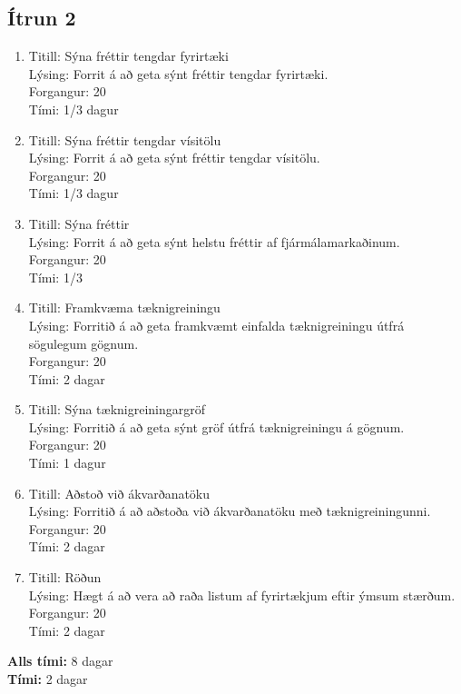 \documentclass[a4,12pt]{article}
\begin{document}
\subsection{Ítrun 2}
\begin{enumerate}[]
\item Titill: Sýna fréttir tengdar fyrirtæki\\
Lýsing: Forrit á að geta sýnt fréttir tengdar fyrirtæki.\\
Forgangur: 20\\
Tími: 1/3 dagur

\item Titill: Sýna fréttir tengdar vísitölu\\
Lýsing: Forrit á að geta sýnt fréttir tengdar vísitölu.\\ 
Forgangur: 20\\
Tími: 1/3 dagur

\item Titill: Sýna fréttir\\
Lýsing: Forrit á að geta sýnt helstu fréttir af fjármálamarkaðinum.\\
Forgangur: 20\\
Tími: 1/3

\item Titill: Framkvæma tæknigreiningu\\
Lýsing: Forritið á að geta framkvæmt einfalda tæknigreiningu útfrá sögulegum gögnum.\\
Forgangur: 20\\
Tími: 2 dagar

\item Titill: Sýna tæknigreiningargröf\\
Lýsing: Forritið á að geta sýnt gröf útfrá tæknigreiningu á gögnum.\\
Forgangur: 20\\
Tími: 1 dagur

\item Titill: Aðstoð við ákvarðanatöku\\
Lýsing: Forritið á að aðstoða við ákvarðanatöku með tæknigreiningunni.\\
Forgangur: 20\\
Tími: 2 dagar

\item Titill: Röðun\\
Lýsing: Hægt á að vera að raða listum af fyrirtækjum eftir ýmsum stærðum.\\
Forgangur: 20\\
Tími: 2 dagar
\end{enumerate}
\textbf{Alls tími:} 8 dagar\\
\textbf{Tími:} 2 dagar\\
\end{document}
